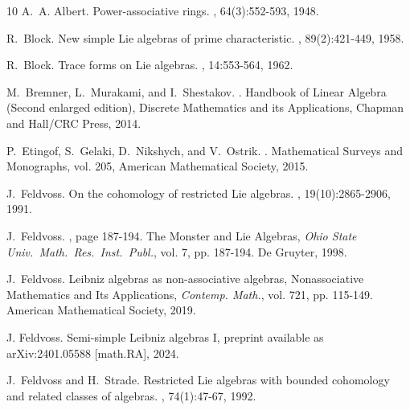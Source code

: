 \documentclass{jonasart}
\begin{document}
    {\footnotesize
    \begin{thebibliography}{10}
        A.~A. Albert.
        \newblock Power-associative rings.
        , 64(3):552-593, 1948.

        R.~Block.
        \newblock New simple Lie algebras of prime characteristic.
        , 89(2):421-449, 1958.

        R.~Block.
        \newblock Trace forms on Lie algebras.
        , 14:553-564, 1962.

        M.~Bremner, L.~Murakami, and I.~Shestakov.
        .
        \newblock Handbook of Linear Algebra (Second enlarged edition), Discrete Mathematics and its Applications,
        \newblock Chapman and Hall/CRC Press, 2014.

        P.~Etingof, S.~Gelaki, D.~Nikshych, and V.~Ostrik.
        .
        \newblock Mathematical Surveys and Monographs, vol. 205,
        \newblock American Mathematical Society, 2015.

        J.~Feldvoss.
        \newblock On the cohomology of restricted Lie algebras.
        , 19(10):2865-2906, 1991.

        J.~Feldvoss.
        , page 187-194.
        \newblock The Monster and Lie Algebras, {\em Ohio State Univ.\ Math.\ Res.\ Inst.\ Publ.}, vol. 7, pp. 187-194.
        \newblock De Gruyter, 1998.

        J.~Feldvoss.
        \newblock Leibniz algebras as non-associative algebras,
        \newblock Nonassociative Mathematics and Its Applications, {\it Contemp. Math.}, vol. 721, pp. 115-149.
        \newblock American Mathematical Society, 2019.

        J. Feldvoss.
        \newblock Semi-simple Leibniz algebras I,
        \newblock preprint available as arXiv:2401.05588 [math.RA], 2024.

        J.~Feldvoss and H.~Strade.
        \newblock Restricted Lie algebras with bounded cohomology and related classes of algebras.
        , 74(1):47-67, 1992.


\end{thebibliography}}
\end{document}

